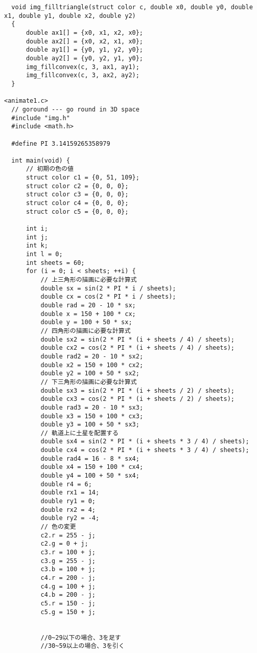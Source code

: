 \documentclass[12pt,a4j]{jarticle}
\begin{document}
\begin{verbatim}
  void img_filltriangle(struct color c, double x0, double y0, double x1, double y1, double x2, double y2)
  {
      double ax1[] = {x0, x1, x2, x0};
      double ax2[] = {x0, x2, x1, x0};
      double ay1[] = {y0, y1, y2, y0};
      double ay2[] = {y0, y2, y1, y0};
      img_fillconvex(c, 3, ax1, ay1);
      img_fillconvex(c, 3, ax2, ay2);
  }

<animate1.c>
  // goround --- go round in 3D space
  #include "img.h"
  #include <math.h>

  #define PI 3.14159265358979

  int main(void) {
      // 初期の色の値
      struct color c1 = {0, 51, 109};
      struct color c2 = {0, 0, 0};
      struct color c3 = {0, 0, 0};
      struct color c4 = {0, 0, 0};
      struct color c5 = {0, 0, 0};

      int i;
      int j;
      int k;
      int l = 0;
      int sheets = 60;
      for (i = 0; i < sheets; ++i) {
          // 上三角形の描画に必要な計算式
          double sx = sin(2 * PI * i / sheets);
          double cx = cos(2 * PI * i / sheets);
          double rad = 20 - 10 * sx;
          double x = 150 + 100 * cx;
          double y = 100 + 50 * sx;
          // 四角形の描画に必要な計算式
          double sx2 = sin(2 * PI * (i + sheets / 4) / sheets);
          double cx2 = cos(2 * PI * (i + sheets / 4) / sheets);
          double rad2 = 20 - 10 * sx2;
          double x2 = 150 + 100 * cx2;
          double y2 = 100 + 50 * sx2;
          // 下三角形の描画に必要な計算式
          double sx3 = sin(2 * PI * (i + sheets / 2) / sheets);
          double cx3 = cos(2 * PI * (i + sheets / 2) / sheets);
          double rad3 = 20 - 10 * sx3;
          double x3 = 150 + 100 * cx3;
          double y3 = 100 + 50 * sx3;
          // 軌道上に土星を配置する
          double sx4 = sin(2 * PI * (i + sheets * 3 / 4) / sheets);
          double cx4 = cos(2 * PI * (i + sheets * 3 / 4) / sheets);
          double rad4 = 16 - 8 * sx4;
          double x4 = 150 + 100 * cx4;
          double y4 = 100 + 50 * sx4;
          double r4 = 6;
          double rx1 = 14;
          double ry1 = 0;
          double rx2 = 4;
          double ry2 = -4;
          // 色の変更
          c2.r = 255 - j;
          c2.g = 0 + j;
          c3.r = 100 + j;
          c3.g = 255 - j;
          c3.b = 100 + j;
          c4.r = 200 - j;
          c4.g = 100 + j;
          c4.b = 200 - j;
          c5.r = 150 - j;
          c5.g = 150 + j;


          //0~29以下の場合、3を足す
          //30~59以上の場合、3を引く


\end{verbatim}
\end{document}
